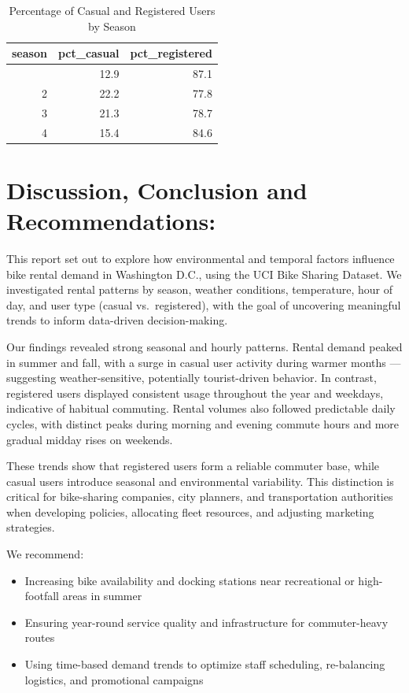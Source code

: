 \documentclass[
  12pt,
]{article}
\providecommand{\tightlist}{%
  \setlength{\itemsep}{0pt}\setlength{\parskip}{0pt}}\usepackage{longtable,booktabs,array}
\begin{document}
\begin{longtable}[]{@{}rrr@{}}

\caption{\label{tbl-user-share-by-season}Percentage of Casual and
Registered Users by Season}

\tabularnewline

\toprule\noalign{}
season & pct\_casual & pct\_registered \\
\midrule\noalign{}
\endhead
\bottomrule\noalign{}
\endlastfoot
1 & 12.9 & 87.1 \\
2 & 22.2 & 77.8 \\
3 & 21.3 & 78.7 \\
4 & 15.4 & 84.6 \\

\end{longtable}

\section{Discussion, Conclusion and
Recommendations:}\label{discussion-conclusion-and-recommendations}

This report set out to explore how environmental and temporal factors
influence bike rental demand in Washington D.C., using the UCI Bike
Sharing Dataset. We investigated rental patterns by season, weather
conditions, temperature, hour of day, and user type (casual
vs.~registered), with the goal of uncovering meaningful trends to inform
data-driven decision-making.

Our findings revealed strong seasonal and hourly patterns. Rental demand
peaked in summer and fall, with a surge in casual user activity during
warmer months --- suggesting weather-sensitive, potentially
tourist-driven behavior. In contrast, registered users displayed
consistent usage throughout the year and weekdays, indicative of
habitual commuting. Rental volumes also followed predictable daily
cycles, with distinct peaks during morning and evening commute hours and
more gradual midday rises on weekends.

These trends show that registered users form a reliable commuter base,
while casual users introduce seasonal and environmental variability.
This distinction is critical for bike-sharing companies, city planners,
and transportation authorities when developing policies, allocating
fleet resources, and adjusting marketing strategies.

We recommend:

\begin{itemize}
\tightlist
\item
  Increasing bike availability and docking stations near recreational or
  high-footfall areas in summer
\item
  Ensuring year-round service quality and infrastructure for
  commuter-heavy routes
\item
  Using time-based demand trends to optimize staff scheduling,
  re-balancing logistics, and promotional campaigns
\end{itemize}
\end{document}
